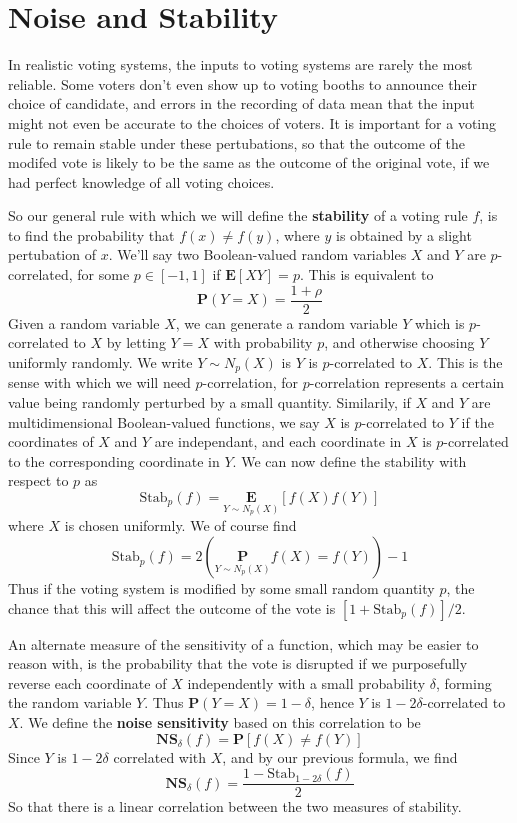 \section{Noise and Stability}

In realistic voting systems, the inputs to voting systems are rarely the most reliable. Some voters don't even show up to voting booths to announce their choice of candidate, and errors in the recording of data mean that the input might not even be accurate to the choices of voters. It is important for a voting rule to remain stable under these pertubations, so that the outcome of the modifed vote is likely to be the same as the outcome of the original vote, if we had perfect knowledge of all voting choices.

So our general rule with which we will define the {\bf stability} of a voting rule $f$, is to find the probability that $f(x) \neq f(y)$, where $y$ is obtained by a slight pertubation of $x$. We'll say two Boolean-valued random variables $X$ and $Y$ are $p$-correlated, for some $p \in [-1,1]$ if $\mathbf{E}[XY] = p$. This is equivalent to
%
\[ \mathbf{P}(Y = X) = \frac{1 + \rho}{2} \]
%
Given a random variable $X$, we can generate a random variable $Y$ which is $p$-correlated to $X$ by letting $Y = X$ with probability $p$, and otherwise choosing $Y$ uniformly randomly. We write $Y \sim N_p(X)$ is $Y$ is $p$-correlated to $X$. This is the sense with which we will need $p$-correlation, for $p$-correlation represents a certain value being randomly perturbed by a small quantity. Similarily, if $X$ and $Y$ are multidimensional Boolean-valued functions, we say $X$ is $p$-correlated to $Y$ if the coordinates of $X$ and $Y$ are independant, and each coordinate in $X$ is $p$-correlated to the corresponding coordinate in $Y$. We can now define the stability with respect to $p$ as
%
\[ \text{Stab}_p(f) = \underset{Y \sim N_p(X)}{\mathbf{E}}[f(X)f(Y)] \]
%
where $X$ is chosen uniformly. We of course find
%
\[\text{Stab}_p(f) = 2 \left( \underset{Y \sim N_p(X)}{\mathbf{P}} f(X) = f(Y)  \right) - 1 \]
%
Thus if the voting system is modified by some small random quantity $p$, the chance that this will affect the outcome of the vote is $[1 + \text{Stab}_p(f)]/2$.

An alternate measure of the sensitivity of a function, which may be easier to reason with, is the probability that the vote is disrupted if we purposefully reverse each coordinate of $X$ independently with a small probability $\delta$, forming the random variable $Y$. Thus $\mathbf{P}(Y = X) = 1 - \delta$, hence $Y$ is $1 - 2\delta$-correlated to $X$. We define the {\bf noise sensitivity} based on this correlation to be
%
\[ \mathbf{NS}_\delta(f) = \mathbf{P}[ f(X) \neq f(Y) ]\]
%
Since $Y$ is $1 - 2\delta$ correlated with $X$, and by our previous formula, we find
%
\[ \mathbf{NS}_\delta(f) = \frac{1 - \text{Stab}_{1 - 2\delta}(f)}{2} \]
%
So that there is a linear correlation between the two measures of stability.

